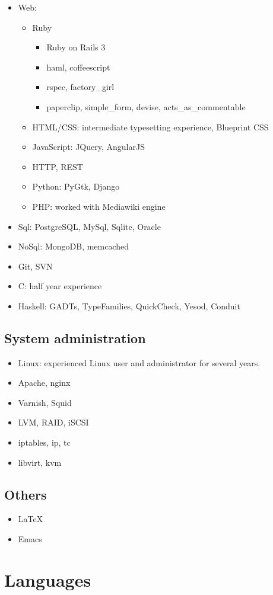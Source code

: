 \documentclass[11pt,a4paper,sans]{moderncv}        %
\begin{document}
\begin{itemize}
\item Web:
  \begin{itemize}
  \item Ruby
    \begin{itemize}
    \item Ruby on Rails 3
    \item haml, coffeescript
    \item rspec, factory\_girl
    \item paperclip, simple\_form, devise, acts\_as\_commentable
    \end{itemize}
  \item HTML/CSS: intermediate typesetting experience, Blueprint CSS
  \item JavaScript: JQuery, AngularJS
  \item HTTP, REST
  \item Python: PyGtk, Django
  \item PHP: worked with Mediawiki engine
  \end{itemize}
\item Sql: PostgreSQL, MySql, Sqlite, Oracle
\item NoSql: MongoDB, memcached
\item Git, SVN
\item C: half year experience
\item Haskell: GADTs, TypeFamilies, QuickCheck, Yesod, Conduit
\end{itemize}

\medskip

\subsection{System administration}

\begin{itemize}
\item Linux: experienced Linux user and administrator for several years.
\item Apache, nginx
\item Varnish, Squid
\item LVM, RAID, iSCSI
\item iptables, ip, tc
\item libvirt, kvm
\end{itemize}

\medskip

\subsection{Others}

\begin{itemize}
\item \LaTeX
\item Emacs
\end{itemize}

\section{Languages}

\nocite{*}
\end{document}
